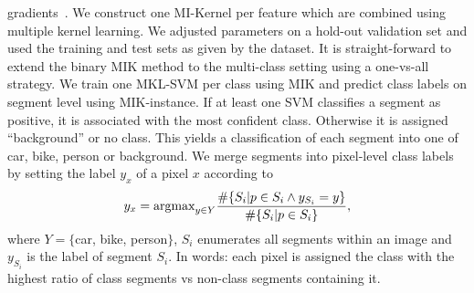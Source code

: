 gradients~\cite{dalal2005histograms}. We construct one MI-Kernel per
feature which are combined using multiple kernel learning.
We adjusted parameters on a hold-out validation set and used the
training and test sets as given by the dataset.
It is straight-forward to extend the binary MIK method to the multi-class
setting using a one-vs-all strategy.
We train one MKL-SVM per class using MIK and predict class labels on segment level
using MIK-instance. If at least one SVM classifies a segment as positive,
it is associated with the most confident class. Otherwise it is assigned
``background'' or no class.
This yields a classification of each segment into one of car, bike, person
or background. We merge segments into pixel-level class labels by setting
the label $y_x$ of a pixel $x$ according to
\vspace{-3mm}
\begin{equation}
    y_x = \text{argmax}_{y \in Y} \frac{\#\{S_i | p \in S_i \land y_{S_i}=y \}}{
    \#\{S_i | p \in S_i \}},
\vspace{-3mm}
\end{equation}
where $Y= \{$car, bike, person$ \}$, $S_i$ enumerates all segments within an
image and $y_{S_i}$ is the label of segment $S_i$. In words: each pixel is
assigned the class with the highest ratio of class segments vs non-class
segments containing it.

